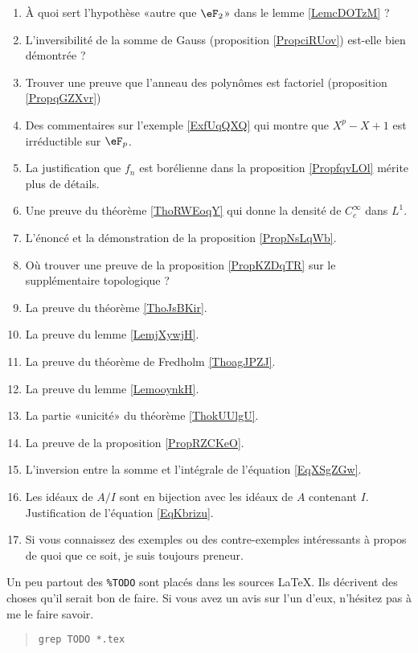 \begin{enumerate}
    \item
        À quoi sert l'hypothèse «autre que \( \eF_2\)» dans le lemme \ref{LemcDOTzM} ?
    \item
        L'inversibilité de la somme de Gauss (proposition \ref{PropciRUov}) est-elle bien démontrée ?
    \item
        Trouver une preuve que l'anneau des polynômes est factoriel (proposition \ref{PropqGZXvr})
    \item
        Des commentaires sur l'exemple \ref{ExfUqQXQ} qui montre que \( X^p-X+1\) est irréductible sur \( \eF_p\).
    \item
        La justification que \( f_n\) est borélienne dans la proposition \ref{PropfqvLOl} mérite plus de détails.
    \item
        Une preuve du théorème \ref{ThoRWEoqY} qui donne la densité de \( C^{\infty}_c\) dans \( L^1\).
    \item
        L'énoncé et la démonstration de la proposition \ref{PropNsLqWb}.
    \item
        Où trouver une preuve de la proposition \ref{PropKZDqTR} sur le supplémentaire topologique ?
    \item
        La preuve du théorème \ref{ThoJsBKir}.
    \item
        La preuve du lemme \ref{LemjXywjH}.
    \item
        La preuve du théorème de Fredholm \ref{ThoagJPZJ}.
    \item
        La preuve du lemme \ref{LemooynkH}.
    \item
        La partie «unicité» du théorème \ref{ThokUUlgU}.
    \item
        La preuve de la proposition \ref{PropRZCKeO}.
    \item
        L'inversion entre la somme et l'intégrale de l'équation \eqref{EqXSgZGw}.
    \item
        Les idéaux de \( A/I\) sont en bijection avec les idéaux de \( A\) contenant \( I\). Justification de l'équation \eqref{EqKbrizu}.
    \item
        Si vous connaissez des exemples ou des contre-exemples intéressants à propos de quoi que ce soit, je suis toujours preneur.
\end{enumerate}

Un peu partout des \verb+%TODO+ sont placés dans les sources \LaTeX. Ils décrivent des choses qu'il serait bon de faire. Si vous avez un avis sur l'un d'eux, n'hésitez pas à me le faire savoir.
\begin{quote}
    \texttt{grep TODO *.tex}
\end{quote}

